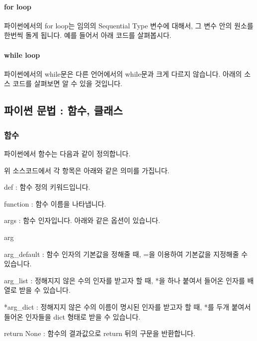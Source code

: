 \paragraph{for loop} 파이썬에서의 for loop는 임의의 Sequential Type 변수에 대해서, 그 변수 안의 원소를 한번씩 돌게 됩니다. 예를 들어서 아래 코드를 살펴봅시다. 




\paragraph{while loop} 파이썬에서의 while문은 다른 언어에서의 while문과 크게 다르지 않습니다. 아래의 소스 코드를 살펴보면 알 수 있을 것입니다. 



                
                
\subsection{파이썬 문법 : 함수, 클래스}

\subsubsection{함수}

파이썬에서 함수는 다음과 같이 정의합니다. 



                
위 소스코드에서 각 항목은 아래와 같은 의미를 가집니다. 

\begin{compactitem} 
\item def : 함수 정의 키워드입니다. 
\item function : 함수 이름을 나타냅니다. 
\item args : 함수 인자입니다. 아래와 같은 옵션이 있습니다. 
\begin{compactitem} 
\item arg 
\item arg\_default : 함수 인자의 기본값을 정해줄 때, =을 이용하여 기본값을 지정해줄 수 있습니다. 
\item *arg\_list : 정해지지 않은 수의 인자를 받고자 할 때, *을 하나 붙여서 들어온 인자를 배열로 받을 수 있습니다. 
\item **arg\_dict : 정해지지 않은 수의 이름이 명시된 인자를 받고자 할 때, *를 두개 붙여서 들어온 인자들을 dict 형태로 받을 수 있습니다. 
\end{compactitem} 
\item return None : 함수의 결과값으로 return 뒤의 구문을 반환합니다. 
\end{compactitem}


